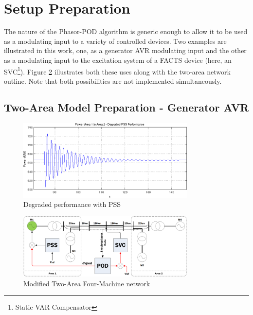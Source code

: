 \documentclass[journal]{IEEEtran}
\begin{document}
\section{Setup Preparation}\label{SetupPreparation}

The nature of the Phasor-POD algorithm is generic enough to allow it to be used as a modulating input to a variety of controlled devices. Two examples are illustrated in this work, one, as a generator AVR modulating input and the other as a modulating input to the excitation system of a FACTS device (here, an SVC\footnote{Static VAR Compensator}). Figure \ref{NetworkOutline} illustrates both these uses along with the two-area network outline. Note that both possibilities are not implemented simultaneously.

\subsection{Two-Area Model Preparation - Generator AVR}

\begin{figure}[!th]
\centering
\includegraphics[width=3.5in]{PSS_degraded_performance.png}
\caption{Degraded performance with PSS}
\label{PSS_Degrade}
\end{figure}

\begin{figure}[!th]
\centering
\includegraphics[width=3.5in]{Kundur2Area_outline_multi.png}
\caption{Modified Two-Area Four-Machine network}
\label{NetworkOutline}
\end{figure}
\end{document}
